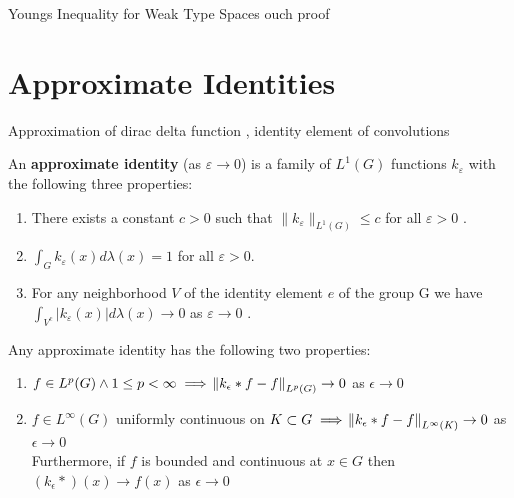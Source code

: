 \begin{theorem}
Youngs Inequality for Weak Type Spaces
ouch proof
\end{theorem}

\section{Approximate Identities}

Approximation of dirac delta function , identity element of convolutions

\begin{definition}
An \textbf{approximate identity} (as $\varepsilon \rightarrow 0$) is a family of $L^1(G)$ functions $k_\varepsilon$ with the following three properties: 
\begin{enumerate}[label=(\roman*)]
\item There exists a constant $c > 0$ such that $\| k_\varepsilon \| _ {L^1(G)} \leqslant c$ for all $ \varepsilon > 0 $ . 
\item $ \int_G k_\varepsilon(x) d\lambda(x) = 1$ for all $\varepsilon > 0 $.
\item For any neighborhood $V$ of the identity element $e$ of the group G we have $ \int_{V^c} | k_\varepsilon(x) | d \lambda(x) \rightarrow 0  $ as $ \varepsilon \rightarrow 0 $ . 
\end{enumerate}
\end{definition}

\begin{theorem}
Any approximate identity has the following two properties:
\begin{enumerate}
\item $f \in L^p(G) \wedge 1 \leq p < \infty \implies \norm{k_\epsilon \ast f - f}_{L^p(G)} \to 0 $ as $ \epsilon \to 0$
\item $f \in L^\infty(G)$ uniformly continuous on $K \subset G \implies \norm{k_\epsilon \ast f - f}_{L^\infty(K)} \to 0$ as $\epsilon \to 0$ \\
Furthermore, if $f$ is bounded and continuous at $x \in G$ then
$ (k_\epsilon \ast )(x) \to f(x) $ as $\epsilon \to 0$ 
\end{enumerate}
\end{theorem}

